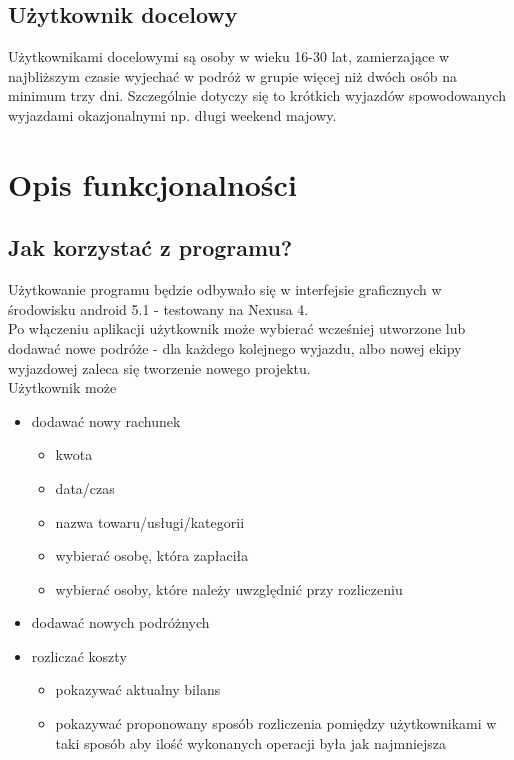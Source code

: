\documentclass[12pt, letterpaper, ]{article}
\begin{document}
		\subsection{Użytkownik docelowy}
			Użytkownikami docelowymi są osoby w wieku 16-30 lat, zamierzające w najbliższym czasie wyjechać w podróż w grupie więcej niż dwóch osób na minimum trzy dni. Szczególnie dotyczy się to krótkich wyjazdów spowodowanych wyjazdami okazjonalnymi np. długi weekend majowy. 
			
	\section[Opis funkcjonalności]{Opis funkcjonalności}
		\subsection{Jak korzystać z programu?}
			Użytkowanie programu będzie odbywało się w interfejsie graficznych w środowisku android 5.1 - testowany na Nexusa 4.
			\\
			Po włączeniu aplikacji użytkownik może wybierać wcześniej utworzone lub dodawać nowe podróże - dla każdego kolejnego wyjazdu, albo nowej ekipy wyjazdowej zaleca się tworzenie nowego projektu. 
			\\
			Użytkownik może
			\begin{itemize}
				\item dodawać nowy rachunek
				\begin{itemize}
					\item kwota
					\item data/czas
					\item nazwa towaru/usługi/kategorii
					\item wybierać osobę, która zapłaciła 
					\item wybierać osoby, które należy uwzględnić przy rozliczeniu
				\end{itemize}
				\item dodawać nowych podróżnych
				\item rozliczać koszty
				\begin{itemize}
					\item pokazywać aktualny bilans
					\item pokazywać proponowany sposób rozliczenia pomiędzy użytkownikami w taki sposób aby ilość wykonanych operacji była jak najmniejsza
				\end{itemize}
			\end{itemize}
			
\end{document}
